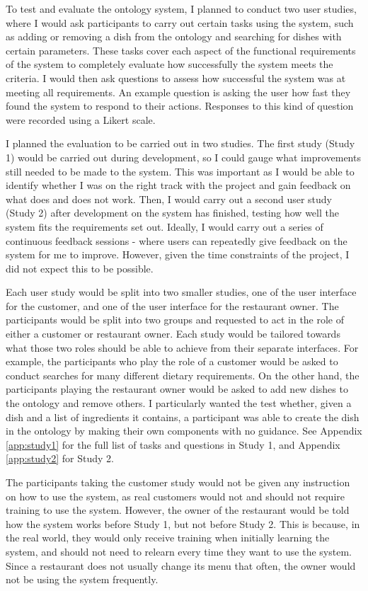 To test and evaluate the ontology system, I planned to conduct two user studies, where I would ask participants to carry out certain tasks using the system, such as adding or removing a dish from the ontology and searching for dishes with certain parameters. These tasks cover each aspect of the functional requirements of the system to completely evaluate how successfully the system meets the criteria. I would then ask questions to assess how successful the system was at meeting all requirements. An example question is asking the user how fast they found the system to respond to their actions. Responses to this kind of question were recorded using a Likert scale.

I planned the evaluation to be carried out in two studies. The first study (Study 1) would be carried out during development, so I could gauge what improvements still needed to be made to the system. This was important as I would be able to identify whether I was on the right track with the project and gain feedback on what does and does not work. Then, I would carry out a second user study (Study 2) after development on the system has finished, testing how well the system fits the requirements set out. Ideally, I would carry out a series of continuous feedback sessions - where users can repeatedly give feedback on the system for me to improve. However, given the time constraints of the project, I did not expect this to be possible.

Each user study would be split into two smaller studies, one of the user interface for the customer, and one of the user interface for the restaurant owner. The participants would be split into two groups and requested to act in the role of either a customer or restaurant owner. Each study would be tailored towards what those two roles should be able to achieve from their separate interfaces. For example, the participants who play the role of a customer would be asked to conduct searches for many different dietary requirements. On the other hand, the participants playing the restaurant owner would be asked to add new dishes to the ontology and remove others. I particularly wanted the test whether, given a dish and a list of ingredients it contains, a participant was able to create the dish in the ontology by making their own components with no guidance. See Appendix \ref{app:study1} for the full list of tasks and questions in Study 1, and Appendix \ref{app:study2} for Study 2.

The participants taking the customer study would not be given any instruction on how to use the system, as real customers would not and should not require training to use the system. However, the owner of the restaurant would be told how the system works before Study 1, but not before Study 2. This is because, in the real world, they would only receive training when initially learning the system, and should not need to relearn every time they want to use the system. Since a restaurant does not usually change its menu that often, the owner would not be using the system frequently.


